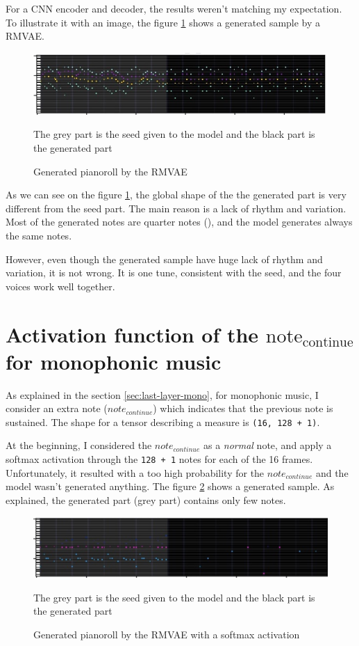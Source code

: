 \documentclass[12pt]{report}
\begin{document}
For a CNN encoder and decoder, the results weren't matching my expectation.
To illustrate it with an image, the figure \ref{fig:rmvae-generated} shows a generated sample by a RMVAE.

\begin{figure}[htpb]
    \centering
    \includegraphics[width=\textwidth]{images/generated_midis/RMVAE/generated_cnn.jpg}
    \caption{Generated pianoroll by the RMVAE}
    The grey part is the seed given to the model and the black part is the generated part
    \label{fig:rmvae-generated}
\end{figure}

As we can see on the figure \ref{fig:rmvae-generated}, the global shape of the the generated part is very different from the seed part.
The main reason is a lack of rhythm and variation.
Most of the generated notes are quarter notes (\musQuarter), and the model generates always the same notes.

However, even though the generated sample have huge lack of rhythm and variation, it is not wrong.
It is one tune, consistent with the seed, and the four voices work well together.

\section{Activation function of the $\text{note}_{\text{continue}}$ for monophonic music}

As explained in the section \ref{sec:last-layer-mono}, for monophonic music, I consider an extra note ($note_{continue}$) which indicates that the previous note is sustained.
The shape for a tensor describing a measure is \texttt{(16, 128 + 1)}.

At the beginning, I considered the $note_{continue}$ as a \textit{normal} note, and apply a softmax activation through the \texttt{128 + 1} notes for each of the 16 frames.
Unfortunately, it resulted with a too high probability for the $note_{continue}$ and the model wasn't generated anything.
The figure \ref{fig:rmvae-generated-silence} shows a generated sample.
As explained, the generated part (grey part) contains only few notes.

\begin{figure}[htbp]
    \centering
    \includegraphics[width=\textwidth]{images/generated_midis/RMVAE/cnn_generation_silcence.jpg}
    \caption{Generated pianoroll by the RMVAE with a softmax activation}
    The grey part is the seed given to the model and the black part is the generated part
    \label{fig:rmvae-generated-silence}
\end{figure}
\end{document}
